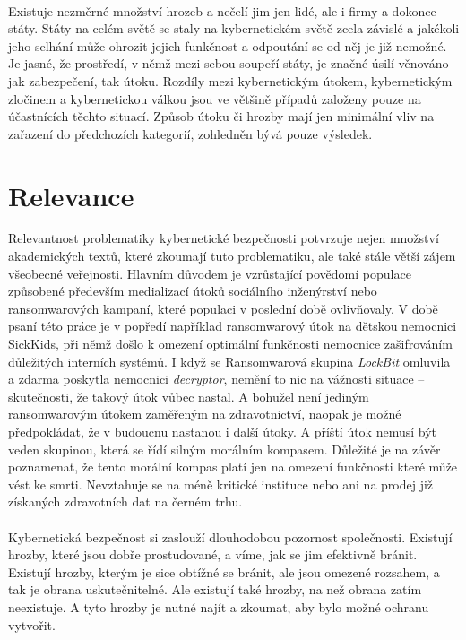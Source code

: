 \paragraph{}
Existuje nezměrné množství hrozeb a nečelí jim jen lidé, ale i firmy a dokonce státy.
Státy na celém světě se staly na kybernetickém světě zcela závislé a jakékoli jeho selhání může ohrozit jejich funkčnost a odpoutání se od něj je již nemožné.\cite{LI20218176}
Je jasné, že prostředí, v němž mezi sebou soupeří státy, je značné úsilí věnováno jak zabezpečení, tak útoku.
Rozdíly mezi kybernetickým útokem, kybernetickým zločinem a kybernetickou válkou jsou ve většině případů založeny pouze na účastnících těchto situací.\cite{LI20218176}
Způsob útoku či hrozby mají jen minimální vliv na zařazení do předchozích kategorií, zohledněn bývá pouze výsledek.

\section{Relevance}\label{sec:relevance}
Relevantnost problematiky kybernetické bezpečnosti potvrzuje nejen množství akademických textů, které zkoumají tuto problematiku, ale také stále větší zájem všeobecné veřejnosti.
Hlavním důvodem je vzrůstající povědomí populace způsobené především medializací útoků sociálního inženýrství nebo ransomwarových kampaní, které populaci v poslední době ovlivňovaly.
V době psaní této práce je v popředí například ransomwarový útok na dětskou nemocnici SickKids, při němž došlo k omezení optimální funkčnosti nemocnice zašifrováním důležitých interních systémů.\cite{bleep_sickkids_ransom}
I když se Ransomwarová skupina \textit{LockBit} omluvila a zdarma poskytla nemocnici \textit{decryptor}, nemění to nic na vážnosti situace – skutečnosti, že takový útok vůbec nastal.
A bohužel není jediným ransomwarovým útokem zaměřeným na zdravotnictví, naopak je možné předpokládat, že v budoucnu nastanou i další útoky.
A příští útok nemusí být veden skupinou, která se řídí silným morálním kompasem.
Důležité je na závěr poznamenat, že tento morální kompas platí jen na omezení funkčnosti které může vést ke smrti.
Nevztahuje se na méně kritické instituce nebo ani na prodej již získaných zdravotních dat na černém trhu.

\paragraph{}
Kybernetická bezpečnost si zaslouží dlouhodobou pozornost společnosti.
Existují hrozby, které jsou dobře prostudované, a víme, jak se jim efektivně bránit.
Existují hrozby, kterým je sice obtížné se bránit, ale jsou omezené rozsahem, a tak je obrana uskutečnitelné.
Ale existují také hrozby, na než obrana zatím neexistuje.
A tyto hrozby je nutné najít a zkoumat, aby bylo možné ochranu vytvořit.

